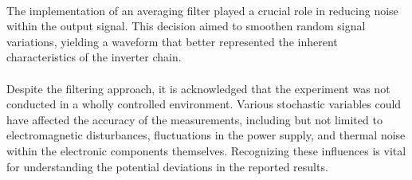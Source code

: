 \documentclass[onecolumn]{article}
\begin{document}
\paragraph*{}
The implementation of an averaging filter played a crucial role in reducing noise within the output signal. This decision aimed to smoothen random signal variations, yielding a waveform that better represented the inherent characteristics of the inverter chain.
\paragraph*{}
Despite the filtering approach, it is acknowledged that the experiment was not conducted in a wholly controlled environment. Various stochastic variables could have affected the accuracy of the measurements, including but not limited to electromagnetic disturbances, fluctuations in the power supply, and thermal noise within the electronic components themselves. Recognizing these influences is vital for understanding the potential deviations in the reported results.
\end{document}
